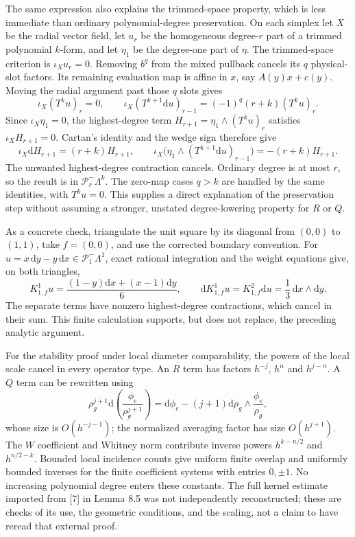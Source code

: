 \documentclass[10pt]{article}
\begin{document}
The same expression also explains the trimmed-space property, which is less immediate than ordinary polynomial-degree preservation. On each simplex let \(X\) be the radial vector field, let \(u_r\) be the homogeneous degree-\(r\) part of a trimmed polynomial \(k\)-form, and let \(\eta_1\) be the degree-one part of \(\eta\). The trimmed-space criterion is \(\iota_Xu_r=0\). Removing \(b^q\) from the mixed pullback cancels its \(q\) physical-slot factors. Its remaining evaluation map is affine in \(x\), say \(A(y)x+c(y)\). Moving the radial argument past those \(q\) slots gives \[\iota_X(T^ku)_r=0,\qquad
\iota_X(T^{k+1}\mathrm du)_{r-1}
=(-1)^q(r+k)(T^ku)_r .\] Since \(\iota_X\eta_1=0\), the highest-degree term \(H_{r+1}=\eta_1\wedge(T^ku)_r\) satisfies \(\iota_XH_{r+1}=0\). Cartan’s identity and the wedge sign therefore give \[\iota_X\mathrm dH_{r+1}=(r+k)H_{r+1},\qquad
\iota_X\bigl(\eta_1\wedge(T^{k+1}\mathrm du)_{r-1}\bigr)
=-(r+k)H_{r+1}.\] The unwanted highest-degree contraction cancels. Ordinary degree is at most \(r\), so the result is in \(\mathcal P_r^-\Lambda^k\). The zero-map cases \(q>k\) are handled by the same identities, with \(T^ku=0\). This supplies a direct explanation of the preservation step without assuming a stronger, unstated degree-lowering property for \(R\) or \(Q\).\par
As a concrete check, triangulate the unit square by its diagonal from \((0,0)\) to \((1,1)\), take \(f=(0,0)\), and use the corrected boundary convention. For \(u=x\,\mathrm dy-y\,\mathrm dx\in\mathcal P_1^-\Lambda^1\), exact rational integration and the weight equations give, on both triangles, \[K_{1,f}^1u=\frac{(1-y)\mathrm dx+(x-1)\mathrm dy}{6},
\qquad
\mathrm dK_{1,f}^1u=K_{1,f}^2\mathrm du
=\frac13\,\mathrm dx\wedge\mathrm dy .\] The separate terms have nonzero highest-degree contractions, which cancel in their sum. This finite calculation supports, but does not replace, the preceding analytic argument.\par
For the stability proof under local diameter comparability, the powers of the local scale cancel in every operator type. An \(R\) term has factors \(h^{-j}\), \(h^n\) and \(h^{j-n}\). A \(Q\) term can be rewritten using \[\rho_g^{j+1}\mathrm d\!\left(\frac{\phi_e}{\rho_g^{j+1}}\right)
=\mathrm d\phi_e-(j+1)\mathrm d\rho_g\wedge\frac{\phi_e}{\rho_g},\] whose size is \(O(h^{-j-1})\); the normalized averaging factor has size \(O(h^{j+1})\). The \(W\) coefficient and Whitney norm contribute inverse powers \(h^{k-n/2}\) and \(h^{n/2-k}\). Bounded local incidence counts give uniform finite overlap and uniformly bounded inverses for the finite coefficient systems with entries \(0,\pm1\). No increasing polynomial degree enters these constants. The full kernel estimate imported from [7] in Lemma 8.5 was not independently reconstructed; these are checks of its use, the geometric conditions, and the scaling, not a claim to have reread that external proof.\par
\end{document}
